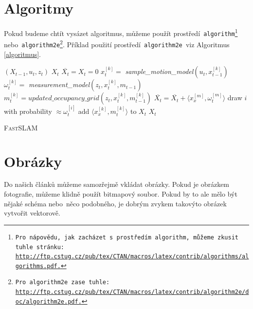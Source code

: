 \documentclass[a4paper, 11pt]{article}
\begin{document}
\bigskip
\pagebreak

\section{Algoritmy}\label{3}

Pokud budeme chtít vysázet algoritmus, můžeme použít prostředí\texttt{ algorithm\footnote{Pro nápovědu, jak zacházet s~prostředím\texttt{ algorithm,} můžeme zkusit tuhle stránku: \\
\hyperlink{http://ftp.cstug.cz/pub/tex/CTAN/macros/latex/contrib/algorithms/algorithms.pdf}{http://ftp.cstug.cz/pub/tex/CTAN/macros/latex/contrib/algorithms/algorithms.pdf.} }} nebo\texttt{ algorithm2e\footnote{Pro\texttt{ algorithm2e }zase tuhle: \hyperlink{http://ftp.cstug.cz/pub/tex/CTAN/macros/latex/contrib/algorithm2e/doc/algorithm2e.pdf}{http://ftp.cstug.cz/pub/tex/CTAN/macros/latex/contrib/algorithm2e/doc/algorithm2e.pdf.} }}.
Příklad použití prostředí\texttt{ algorithm2e }viz Algoritmus \ref{algoritmus}.

\vspace{0.95em}

\begin{algorithm} \label{algoritmus}
    \begin{algorithmic}[1]
    \REQUIRE $(X_{t-1},u_{t},z_{t})$
    \ENSURE $X_{t}$
    \vspace{0.5em}
    \STATE $\overline{X_{t}}=X_{t}=0$
        \STATE $x_{t}^{[k]}=$\emph{ sample\_motion\_model}$(u_{t},x_{t-1}^{[k]})$
        \STATE $\omega_{t}^{[k]}=$\emph{ measurement\_model}$(z_{t},x_{t}^{[k]},m_{t-1})$
        \STATE $m_{t}^{[k]}=updated\_occupancy\_grid(z_{t},x_{t}^{[k]},m_{t-1}^{[k]})$
        \STATE $\overline{X_{t}} = \overline{X_{t}} + \langle x_{x}^{[m]},\omega_{t}^{[m]} \rangle$
    \ENDFOR
        \STATE draw $i$ with probability $\approx \omega_{t}^{[i]}$
        \STATE add $\langle x_{x}^{[k]},m_{t}^{[k]} \rangle$ to $X_{t}$
    \ENDFOR
    \RETURN $X_{t}$

    \end{algorithmic}
        \caption{\normalsize{\textsc{Fast}SLAM}}
\end{algorithm}

\section{Obrázky} \label{4}
Do našich článků můžeme samozřejmě vkládat obrázky. Pokud je obrázkem fotografie, můžeme klidně použít bitmapový soubor. Pokud by to ale mělo být nějaké schéma nebo~něco podobného, je dobrým zvykem takovýto obrázek vytvořit vektorově.
\end{document}
